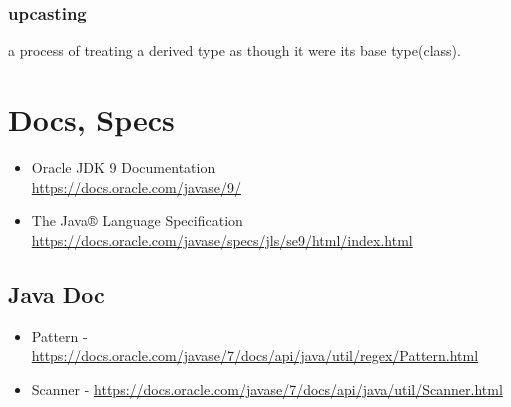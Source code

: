\documentclass{report}
\begin{document}
\subsection{upcasting}
a process of treating a derived type as though it were its base type(class).



\chapter{Docs, Specs}
\begin{itemize}
\item Oracle JDK 9 Documentation\\
\url{https://docs.oracle.com/javase/9/}
\item The Java® Language Specification\\
\url{https://docs.oracle.com/javase/specs/jls/se9/html/index.html}
\end{itemize}


\section{Java Doc}
\begin{itemize}
\item Pattern - \url{https://docs.oracle.com/javase/7/docs/api/java/util/regex/Pattern.html}
\item Scanner - \url{https://docs.oracle.com/javase/7/docs/api/java/util/Scanner.html}
\end{itemize}
\end{document}
